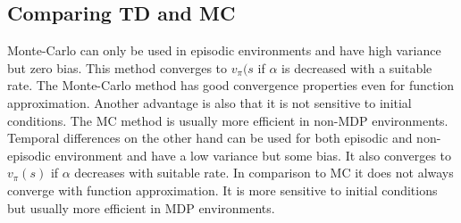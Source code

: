 \subsection*{Comparing TD and MC}
Monte-Carlo can only be used in episodic environments and have high variance but zero bias. This method converges to $v_\pi(s$ if $\alpha$ is decreased with a suitable rate. The Monte-Carlo method has good convergence properties even for function approximation. Another advantage is also that it is not sensitive to initial conditions. The MC method is usually more efficient in non-MDP environments. Temporal differences on the other hand can be used for both episodic and non-episodic environment and have a low variance but some bias. It also converges to $v_\pi(s)$ if $\alpha$ decreases with suitable rate. In comparison to MC it does not always converge with function approximation. It is more sensitive to initial conditions but usually more efficient in MDP environments.






